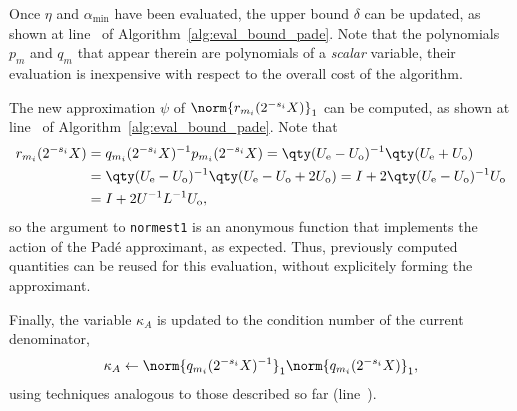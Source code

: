 Once $\eta$ and $\alpha_{\min}$ have been evaluated, the upper bound $\delta$ can be updated, as shown at line~ of Algorithm~\ref{alg:eval_bound_pade}. Note that the polynomials $p_m$ and $q_m$ that appear therein are polynomials of a \emph{scalar} variable, their evaluation is inexpensive with respect to the overall cost of the algorithm.

The new approximation $\psi$ of $\norm{r_{m_i}(2^{-s_i}X)}_1$ can be computed, as shown at line~ of Algorithm~\ref{alg:eval_bound_pade}. Note that 
\begin{align*}
	r_{m_i}(2^{-s_i}X) &= q_{m_i}(2^{-s_i}X)^{-1}p_{m_i}(2^{-s_i}X) = \qty(U_{\textup{e}}-U_{\textup{o}})^{-1}\qty(U_{\textup{e}}+U_{\textup{o}})\\
	 &= \qty(U_{\textup{e}}-U_{\textup{o}})^{-1}\qty(U_{\textup{e}}-U_{\textup{o}}+2U_{\textup{o}})=I+2\qty(U_{\textup{e}}-U_{\textup{o}})^{-1}U_{\textup{o}}\\
	 &= I+2U^{-1}L^{-1}U_{\textup{o}},
\end{align*}
so the argument to \texttt{normest1} is an anonymous function that implements the action of the Padé approximant, as expected. Thus, previously computed quantities can be reused for this evaluation, without explicitely forming the approximant.

Finally, the variable $\kappa_A$ is updated to the condition number of the current denominator, 
\[
	\kappa_A\gets\norm{q_{m_i}(2^{-s_i}X)^{-1}}_1\norm{q_{m_i}(2^{-s_i}X)}_1,
\]
using techniques analogous to those described so far (line~).

